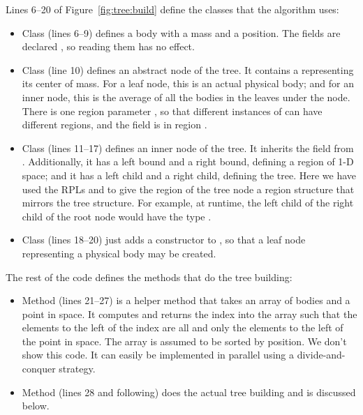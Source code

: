 Lines 6--20 of Figure~\ref{fig:tree:build} define the classes that the
algorithm uses:
%
\begin{itemize}
%
\item Class  (lines 6--9) defines a body with a mass and a
  position.  The fields are declared , so reading them has
  no effect.
%
\item Class  (line 10) defines an abstract node of the tree.
  It contains a  representing its center of mass.  For a
  leaf node, this is an actual physical body; and for an inner node,
  this is the average of all the bodies in the leaves under the node.
  There is one region parameter , so that different instances
  of  can have different regions, and the 
  field is in region .
%
\item Class  (lines 11--17) defines an inner node of
  the tree.  It inherits the  field from .
  Additionally, it has a left bound and a right bound, defining a
  region of 1-D space; and it has a left child and a right child,
  defining the tree.  Here we have used the RPLs  and
   to give the region of the tree node a region
  structure that mirrors the tree structure.  For example, at runtime,
  the left child of the right child of the root node would have the
  type .
%
\item Class  (lines 18--20) just adds a constructor to
  , so that a leaf node representing a physical body may be
  created.
\end{itemize}

The rest of the code defines the methods that do the tree building:
%
\begin{itemize}
%
\item Method  (lines 21--27) is a helper method that
  takes an array of bodies and a point in space.  It computes and
  returns the index into the array such that the elements to the left
  of the index are all and only the elements to the left of the point
  in space.  The array is assumed to be sorted by position.  We don't
  show this code.  It can easily be implemented in parallel using a
  divide-and-conquer strategy.
%
\item Method  (lines 28 and following) does the actual
  tree building and is discussed below.
%
\end{itemize}

